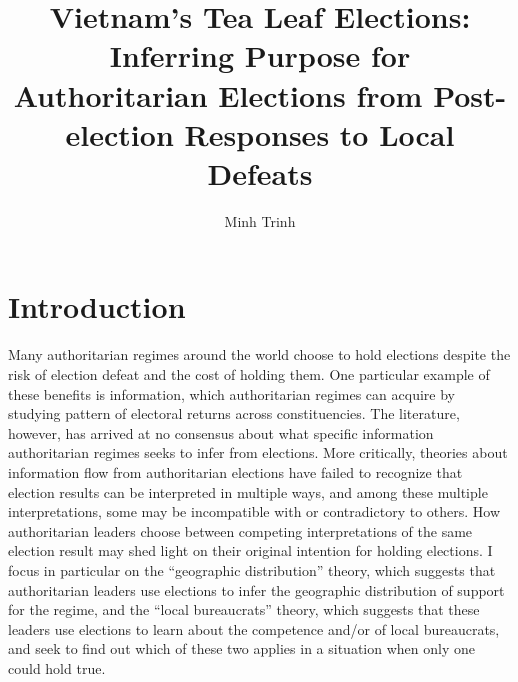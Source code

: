 \documentclass[12pt]{article}\usepackage[]{graphicx}\usepackage[]{color}
\title{Vietnam's Tea Leaf Elections: \\
	Inferring Purpose for Authoritarian Elections from Post-election Responses to Local Defeats}
\author{Minh Trinh}
\newcommand{\1}{\mathbbm{1}}
\begin{document}
\maketitle

\doublespacing

\section{Introduction}

Many authoritarian regimes around the world choose to hold elections despite the risk of election defeat and the cost of holding them. One particular example of these benefits is information, which authoritarian regimes can acquire by studying pattern of electoral returns across constituencies. The literature, however, has arrived at no consensus about what specific information authoritarian regimes seeks to infer from elections. More critically, theories about information flow from authoritarian elections have failed to recognize that election results can be interpreted in multiple ways, and among these multiple interpretations, some may be incompatible with or contradictory to others. How authoritarian leaders choose between competing interpretations of the same election result may shed light on their original intention for holding elections. I focus in particular on the ``geographic distribution'' theory, which suggests that authoritarian leaders use elections to infer the geographic distribution of support for the regime, and the ``local bureaucrats'' theory, which suggests that these leaders use elections to learn about the competence and/or  of local bureaucrats, and seek to find out which of these two applies in a situation when only one could hold true.
\end{document}
